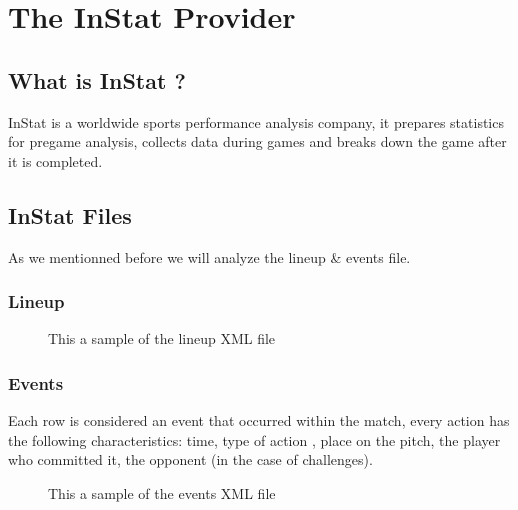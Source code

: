 \documentclass[letterpaper,10pt,english]{jupyterBook}
\begin{document}
\section{The InStat Provider}
\label{\detokenize{Chap1/section2:the-instat-provider}}\label{\detokenize{Chap1/section2::doc}}

\subsection{What is InStat ?}
\label{\detokenize{Chap1/section2:what-is-instat}}
\sphinxAtStartPar
InStat is a worldwide sports performance analysis company, it prepares statistics for pre\sphinxhyphen{}game analysis, collects data during games and breaks down the game after it is completed.


\subsection{InStat Files}
\label{\detokenize{Chap1/section2:instat-files}}
\sphinxAtStartPar
As we mentionned before we will analyze the line\sphinxhyphen{}up \& events file.


\subsubsection{Line\sphinxhyphen{}up}
\label{\detokenize{Chap1/section2:line-up}}
\begin{figure}[htbp]
\centering
\capstart

\noindent{}
\caption{This a sample of the lineup XML file}\label{\detokenize{Chap1/section2:lineupfile-fig}}\end{figure}


\subsubsection{Events}
\label{\detokenize{Chap1/section2:events}}
\sphinxAtStartPar
Each row is considered an event that occurred within the match, every action has the following characteristics: time, type of action , place on the pitch, the player who committed it, the opponent (in the case of challenges).

\begin{figure}[htbp]
\centering
\capstart

\noindent{}
\caption{This a sample of the events XML file}\label{\detokenize{Chap1/section2:id1}}\end{figure}
\end{document}
